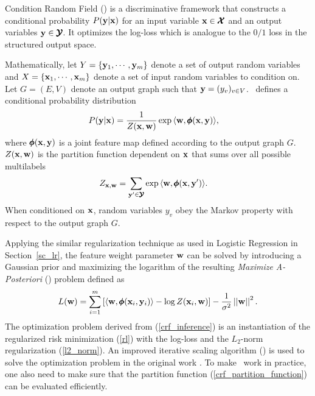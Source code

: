 {Condition Random Field (\crf) \citep{lafferty01,taskar02} is a discriminative framework that constructs a conditional probability $P(\mathbf {y}|\mathbf {x})$ for an input variable $\mathbf {x}\in\pmb {\mathcal{X}}$ and an output variables $\mathbf {y}\in\pmb {\mathcal{Y}}$.
It optimizes the log-loss which is analogue to the $0/1$ loss in the structured output space.

Mathematically, let $Y=\{\mathbf {y}_1,\cdots,\mathbf {y}_m\}$ denote a set of output random variables and $X=\{\mathbf {x}_1,\cdots,\mathbf {x}_m\}$ denote a set of input random variables to condition on.
Let $G=(E,V)$ denote an output graph such that $\mathbf {y} = (y_v)_{v\in V}$.
\crf\ defines a conditional probability distribution
\begin{align*}
	P(\mathbf {y}|\mathbf {x}) &= \frac{1}{Z(\mathbf {x},\mathbf {w})}\exp{\langle \mathbf {w}, \pmb \phi(\mathbf {x},\mathbf {y}) \rangle},
\end{align*}
where $\pmb \phi(\mathbf {x},\mathbf {y})$ is a joint feature map defined according to the output graph $G$. 
$Z(\mathbf {x},\mathbf {w})$ is the partition function dependent on $\mathbf {x}$ that sums over all possible multilabels 
\begin{align}
	Z_{\mathbf {x},\mathbf {w}} &= \sum_{\mathbf {y}'\in\pmb {\mathcal{Y}}}\exp{\langle \mathbf {w}, \pmb \phi(\mathbf {x},\mathbf {y}') \rangle}. \label{crf_partition_function}
\end{align}
When conditioned on $\mathbf {x}$, random variables $y_v$ obey the Markov property with respect to the output graph $G$.

Applying the similar regularization technique as used in Logistic Regression in Section~\ref{sc_lr}, the feature weight parameter $\mathbf {w}$ can be solved by introducing a Gaussian prior and maximizing the logarithm of the resulting \textit{Maximize A-Posteriori} (\map) problem \citep{taskar02} defined as
\begin{align}
	L(\mathbf {w}) = \sum_{i=1}^{m}\left[\langle \mathbf {w}, \pmb \phi(\mathbf {x}_i,\mathbf {y}_i) \rangle-\log{Z(\mathbf {x}_i,\mathbf {w})}\right] - \frac{1}{\sigma^2}\left|\left| \mathbf {w} \right|\right|^2. \label{crf_inference}
\end{align}
The optimization problem derived from (\ref{crf_inference}) is an instantiation of the regularized risk minimization (\ref{rl}) with the log-loss and the $L_2$-norm regularization (\ref{l2_norm}).
An improved iterative scaling algorithm (\iis) \citep{Pietra97inducing} is used to solve the optimization problem in the original work \citep{lafferty01}.
To make \crf\ work in practice, one also need to make sure that the partition function (\ref{crf_partition_function}) can be evaluated efficiently.



}
